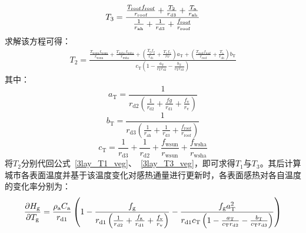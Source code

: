 %
\begin{equation}
  \label{3lay_T3_veg}
  T_{3} = \frac{\frac{T_{\mathrm{roof}} f_{\mathrm{roof}}}{r_{\mathrm{roof}}} + \frac{T_{2}}{r_{\mathrm{d3}}} + \frac{T_{\rm a}}{r_{\mathrm{ah}}}}{\frac{1}{r_{\mathrm{ah}}} + \frac{1}{r_{\mathrm{d3}}} + \frac{f_{\mathrm{roof}}}{r_{\mathrm{roof}}}}
\end{equation}
求解该方程可得：
\begin{equation}
  \begin{split}
    T_{2} = \frac{\frac{T_{\mathrm{wsun}} f_{\mathrm{wsun}}}{r_{\mathrm{wsun}}} + \frac{T_{\mathrm{wsha}} f_{\mathrm{wsha}}}{r_{\mathrm{wsha}}} + \left(\frac{T_{\mathrm{g}} f_{\mathrm{g}}}{r_{\mathrm{d1}}} + \frac{T_{\mathrm{v}} f_{\mathrm{v}}}{rv} \right)a_{\mathrm{T}} + \left(\frac{T_{\mathrm{roof}} f_{\mathrm{roof}}}{r_{\mathrm{roof}}} + \frac{T_{\mathrm{a}}}{r_{\mathrm{ah}}} \right)b_{\mathrm{T}}}{c_{\mathrm{T}} \left(1-\frac{a_{\mathrm{T}}}{c_{\mathrm{T}} r_{\mathrm{d2}}}-\frac{b_{\mathrm{T}}}{c_{\mathrm{T}} r_{\mathrm{d3}}}\right)}
  \end{split}
\end{equation}
其中：
\begin{equation}
  a_{\mathrm{T}} = \frac{1}{r_{\mathrm{d2}} \left(\frac{1}{r_{\mathrm{d2}}} + \frac{fg}{r_{\mathrm{d1}}} + \frac{f_{\mathrm{v}}}{r_{\mathrm{v}}} \right)}
\end{equation}
%
\begin{equation}
  b_{\mathrm{T}} = \frac{1}{r_{\mathrm{d3}} \left(\frac{1}{r_{\mathrm{ah}}} + \frac{1}{r_{\mathrm{d3}}} + \frac{f_{\mathrm{roof}}}{r_{\mathrm{roof}}} \right)}
\end{equation}
%
\begin{equation}
  c_{\mathrm{T}} = \frac{1}{r_{\mathrm{d3}}} + \frac{1}{r_{\mathrm{d2}}} + \frac{f_{\mathrm{wsun}}}{r_{\mathrm{wsun}}} + \frac{f_{\mathrm{wsha}}}{r_{\mathrm{wsha}}}
\end{equation}
将$T_{2}$分别代回公式~\eqref{3lay_T1_veg}、~\eqref{3lay_T3_veg}，即可求得$T_{1}$与$T_{3}$。其后计算城市各表面温度并基于该温度变化对感热通量进行更新时，各表面感热对各自温度的变化率分别为：
\begin{equation}
  \frac{\partial H_{\mathrm{g}}}{\partial T_{\mathrm{g}}} = \frac{\rho _{\rm a} C_{\mathrm a}}{r_{\mathrm{d1}}} \left(1-\frac{f_{\rm g}}{r_{\mathrm{d1}} \left(\frac{1}{r_{\mathrm{d2}}}+\frac{f_{\rm g}}{r_{\mathrm{d1}}}+\frac{f_{\rm v}}{r_{\rm v}}\right)} - \frac{f_{\rm g} a_{\mathrm{T}}^2}{r_{\mathrm{d1}} c_{\mathrm{T}} \left(1-\frac{a_{\mathrm{T}}}{c_{\mathrm{T}} r_{\mathrm{d2}}}-\frac{b_{\mathrm{T}}}{c_{\mathrm{T}} r_{\mathrm{d3}}}\right)}\right)
\end{equation}
